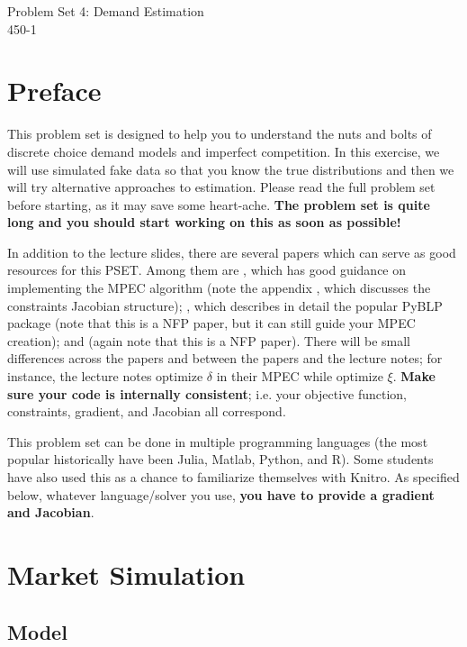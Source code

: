 \documentclass[12pt ]{article}
\begin{document}
\begin{center}
\large
Problem Set 4: Demand Estimation\\
450-1
 \end{center}

\section*{Preface}

 This problem set is designed to help you to understand the nuts and
 bolts of discrete choice demand models and imperfect competition. In
 this exercise, we will use simulated fake data so that you know the
 true distributions and then we will try alternative approaches to
 estimation. Please read the full problem set before starting, as it
 may save some heart-ache. \textbf{The problem set is quite long and you should start working on this as soon as possible!}

 In addition to the lecture slides, there are several papers which can serve as good resources for this PSET. Among them are \citet{dube_improving_2012}, which has good guidance on implementing the MPEC algorithm (note the appendix \citet{dube_online_2012}, which discusses the constraints Jacobian structure); \citet{conlon_best_2020}, which describes in detail the popular PyBLP package (note that this is a NFP paper, but it can still guide your MPEC creation); and \citet{nevo_practitioners_2000} (again note that this is a NFP paper). There will be small differences across the papers and between the papers and the lecture notes; for instance, the lecture notes optimize $\delta$ in their MPEC while \citet{dube_improving_2012} optimize $\xi$. \textbf{Make sure your code is internally consistent}; i.e. your objective function, constraints, gradient, and Jacobian all correspond. 

 This problem set can be done in multiple programming languages (the most popular historically have been Julia, Matlab, Python, and R). Some students have also used this as a chance to familiarize themselves with Knitro. As specified below, whatever language/solver you use, \textbf{you have to provide a gradient and Jacobian}. 
 

\section{Market Simulation}

\subsection{Model}
\end{document}
